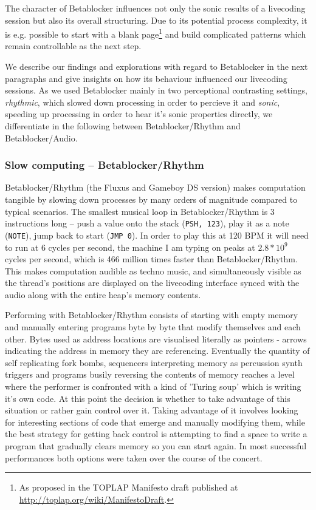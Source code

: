 \documentclass[letterpaper, 12pt]{article}
\begin{document}
The character of Betablocker influences not only the sonic results of a livecoding session but also its overall structuring.
Due to its potential process complexity, it is e.g. possible to start with a blank page\footnote{As proposed in the TOPLAP Manifesto draft published at \url{http://toplap.org/wiki/ManifestoDraft}.}
and build complicated patterns which remain controllable as the next step.

We describe our findings and explorations with regard to Betablocker in the next paragraphs and give insights on how its behaviour influenced our livecoding sessions.
As we used Betablocker mainly in two perceptional contrasting settings, \emph{rhythmic}, which slowed down processing in order to percieve it and \emph{sonic}, speeding up processing in order to hear it's sonic properties directly, we differentiate in the following between Betablocker/Rhythm and Betablocker/Audio.

\subsubsection{Slow computing -- Betablocker/Rhythm}
\label{sub:slow_computing}


Betablocker/Rhythm (the Fluxus and Gameboy DS version) makes computation tangible by slowing down processes by many orders of magnitude compared to typical scenarios. 
The smallest musical loop in Betablocker/Rhythm is 3 instructions long -- push a value onto the stack (\texttt{PSH, 123}), play it as a note (\texttt{NOTE}), jump back to start (\texttt{JMP 0}). 
In order to play this at 120 BPM it will need to run at 6 cycles per second, the machine I am typing on peaks at $2.8*10^9$ cycles per second, which is 466 million times faster than Betablocker/Rhythm. This makes computation audible as techno music, and simultaneously visible as the thread's positions are displayed on the livecoding interface synced with the audio along with the entire heap's memory contents.

Performing with Betablocker/Rhythm consists of starting with empty memory and manually entering programs byte by byte that modify themselves and each other. Bytes used as address locations are visualised literally as pointers - arrows indicating the address in memory they are referencing. 
Eventually the quantity of self replicating fork bombs, sequencers interpreting memory as percussion synth triggers and programs busily reversing the contents of memory reaches a level where the performer is confronted with a kind of 'Turing soup' which is writing it's own code. 
At this point the decision is whether to take advantage of this situation or rather gain control over it.
Taking advantage of it involves looking for interesting sections of code that emerge and manually modifying them, while the best strategy for getting back control is attempting to find a space to write a program that gradually clears memory so you can start again. 
In most successful performances both options were taken over the course of the concert.
\end{document}
